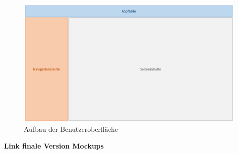 \begin{figure}[h]
	\centering 
	\includegraphics[width=\textwidth]{img/Seitenaufbau1.pdf}
	\captionsetup{format=hang}
	\caption[Aufbau der Benutzeroberfläche]{\label{fig:Seitenaufbau}Aufbau der Benutzeroberfläche}
\end{figure}

\textbf{Link finale Version Mockups}